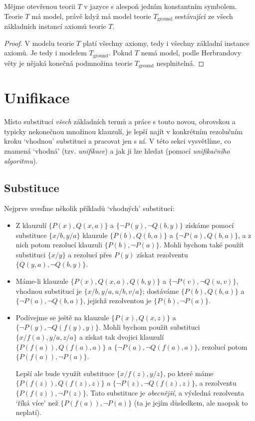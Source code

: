 \begin{corollary}\label{corollary:herbrands-theorem-corollary-ground}
    Mějme otevřenou teorii $T$ v jazyce s alespoň jedním konstantním symbolem. Teorie $T$ má model, právě když má model teorie $T_\text{ground}$ sestávající ze všech základních instancí axiomů teorie $T$.
\end{corollary}
\begin{proof}
V modelu teorie $T$ platí všechny axiomy, tedy i všechny základní instance axiomů. Je tedy i modelem $T_\text{ground}$. Pokud $T$ nemá model, podle Herbrandovy věty je nějaká konečná podmnožina teorie $T_\text{ground}$ nesplnitelná.
\end{proof}


\section{Unifikace}\label{section:unification}

Místo substitucí \emph{všech} základních termů a práce s touto novou, obrovskou a typicky nekonečnou množinou klauzulí, je lepší najít v konkrétním rezolučním kroku `vhodnou' substituci a pracovat jen s ní. V této sekci vysvětlíme, co znamená `vhodná' (tzv. \emph{unifikace}) a jak ji lze hledat (pomocí \emph{unifikačního 
algoritmu}).

\subsection{Substituce}

Nejprve uveďme několik příkladů `vhodných' substitucí:

\begin{example}\label{example:substitutions}
\begin{itemize}
    \item Z klauzulí $\{P(x),Q(x,a)\}$ a $\{\neg P(y),\neg Q(b,y)\}$ získáme pomocí substituce $\{x/b,y/a\}$ klauzule $\{P(b),Q(b,a)\}$ a $\{\neg P(a),Q(b,a)\}$, a z nich potom rezolucí klauzuli $\{P(b),\neg P(a)\}$. Mohli bychom také použít substituci $\{x/y\}$ a rezolucí přes $P(y)$ získat rezolventu $\{Q(y,a),\neg Q(b,y)\}$.
    \item Máme-li klauzule $\{P(x),Q(x,a),Q(b,y)\}$ a $\{\neg P(v),\neg Q(u,v)\}$, vhodnou substitucí je $\{x/b,y/a,u/b,v/a\}$; dostáváme $\{P(b),Q(b,a)\}$ a $\{\neg P(a),\neg Q(b,a)\}$, jejichž rezolventou je $\{P(b),\neg P(a)\}$.
    \item Podívejme se ještě na klauzule $\{P(x),Q(x,z)\}$ a $\{\neg P(y),\neg Q(f(y),y)\}$. Mohli bychom použít substituci $\{x/f(a),y/a,z/a\}$ a získat tak dvojici klauzulí $\{P(f(a)),Q(f(a),a)\}$ a $\{\neg P(a),\neg Q(f(a),a)\}$, rezolucí potom $\{P(f(a)),\neg P(a)\}$.
    
    Lepší ale bude využít substituce $\{x/f(z),y/z\}$, po které máme $\{P(f(z)),Q(f(z),z)\}$ a $\{\neg P(z),\neg Q(f(z),z)\}$, a rezolventu $\{P(f(z)),\neg P(z)\}$. Tato substituce je \emph{obecnější}, a výsledná rezolventa `říká více' než $\{P(f(a)),\neg P(a)\}$ (ta je jejím důsledkem, ale naopak to neplatí).
\end{itemize}
\end{example}

